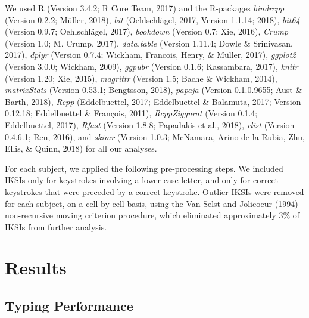 \documentclass[floatsintext,man]{apa6}
\theoremstyle{definition}
\theoremstyle{definition}
\theoremstyle{definition}
\theoremstyle{remark}
\begin{document}
We used R (Version 3.4.2; R Core Team, 2017) and the R-packages
\emph{bindrcpp} (Version 0.2.2; Müller, 2018), \emph{bit} (Oehlschlägel,
2017, Version 1.1.14; 2018), \emph{bit64} (Version 0.9.7; Oehlschlägel,
2017), \emph{bookdown} (Version 0.7; Xie, 2016), \emph{Crump} (Version
1.0; M. Crump, 2017), \emph{data.table} (Version 1.11.4; Dowle \&
Srinivasan, 2017), \emph{dplyr} (Version 0.7.4; Wickham, Francois,
Henry, \& Müller, 2017), \emph{ggplot2} (Version 3.0.0; Wickham, 2009),
\emph{ggpubr} (Version 0.1.6; Kassambara, 2017), \emph{knitr} (Version
1.20; Xie, 2015), \emph{magrittr} (Version 1.5; Bache \& Wickham, 2014),
\emph{matrixStats} (Version 0.53.1; Bengtsson, 2018), \emph{papaja}
(Version 0.1.0.9655; Aust \& Barth, 2018), \emph{Rcpp} (Eddelbuettel,
2017; Eddelbuettel \& Balamuta, 2017; Version 0.12.18; Eddelbuettel \&
François, 2011), \emph{RcppZiggurat} (Version 0.1.4; Eddelbuettel,
2017), \emph{Rfast} (Version 1.8.8; Papadakis et al., 2018),
\emph{rlist} (Version 0.4.6.1; Ren, 2016), and \emph{skimr} (Version
1.0.3; McNamara, Arino de la Rubia, Zhu, Ellis, \& Quinn, 2018) for all
our analyses.

For each subject, we applied the following pre-processing steps. We
included IKSIs only for keystrokes involving a lower case letter, and
only for correct keystrokes that were preceded by a correct keystroke.
Outlier IKSIs were removed for each subject, on a cell-by-cell basis,
using the Van Selst and Jolicoeur (1994) non-recursive moving criterion
procedure, which eliminated approximately 3\% of IKSIs from further
analysis.

\section{Results}\label{results}

\subsection{Typing Performance}\label{typing-performance}
\end{document}
